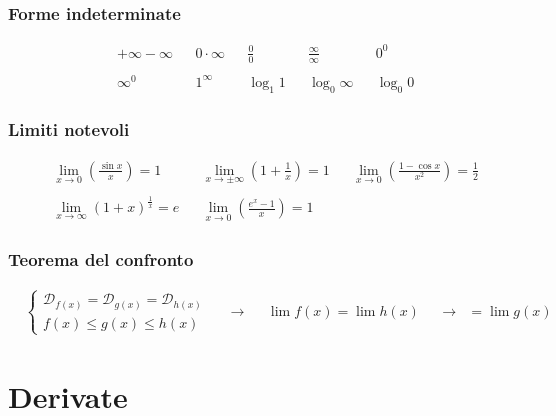 \documentclass[a4paper]{article}
\begin{document}
	\subsubsection*{Forme indeterminate}
	\begin{align*}
		 & +\infty-\infty &  & 0\cdot \infty &  & \frac{0}{0} &  & \frac{\infty}{\infty} &  & 0^0        \\\\
		 & \infty^0       &  & 1^\infty      &  & \log_{1}1   &  & \log_{0} \infty       &  & \log_{0} 0
	\end{align*}
	
	\subsubsection*{Limiti notevoli}
	\begin{align*}
		 & \lim\limits_{x \to 0} \left(\frac{\sin x}{x}\right) = 1 &  & \lim\limits_{x \to \pm \infty} \left(1+\frac{1}{x}\right) = 1	&	&\lim\limits_{x \to 0} \left(\frac{1-\cos x}{x^2}\right) = \frac{1}{2}\\\\
		 & \lim\limits_{x \to \infty} (1+x)^{\frac{1}{x}} = e &  & \lim\limits_{x \to 0} \left(\frac{e^x-1}{x}\right) = 1
		 \end{align*}
	
	\subsubsection*{Teorema del confronto}
	\begin{align*}
	&\begin{cases}
			\mathcal{D}_{f(x)} = \mathcal{D}_{g(x)} = \mathcal{D}_{h(x)}\\
			f(x) \le g(x) \le h(x)
		\end{cases}	&	&\to	&	&\lim f(x) = \lim h(x)	&	&\to	&=\lim g(x)
	\end{align*}
	
	
	\newpage
	\section{Derivate}
\end{document}
